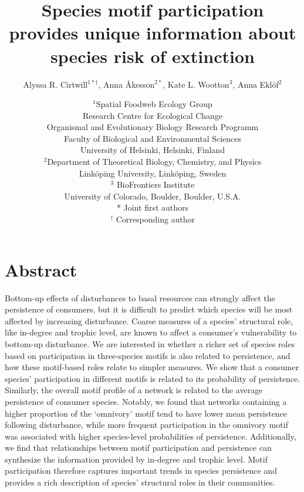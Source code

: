\documentclass[12pt]{article}
\title{Species motif participation provides unique information about species risk of extinction}
\author{Alyssa R. Cirtwill$^{1*\dagger}$, Anna \r{A}kesson$^{2*}$, Kate L. Wootton$^{3}$, Anna Ekl\"{o}f$^{2}$}
\date{
\small$^1$Spatial Foodweb Ecology Group\\
Research Centre for Ecological Change\\
Organismal and Evolutionary Biology Research Programm\\
Faculty of Biological and Environmental Sciences\\
University of Helsinki, Helsinki, Finland\\
\medskip
\small$^2$Department of Theoretical Biology, Chemistry, and Physics\\ 
Link\"{o}ping University, Link\"{o}ping, Sweden\\
\medskip
\small$^3$ BioFrontiers Institute\\
University of Colorado, Boulder, Boulder, U.S.A.\\
\medskip
* Joint first authors\\
\medskip
$^\dagger$ Corresponding author\\
}
\begin{document}
 
\maketitle 
\linenumbers
\raggedright

\setlength{\parindent}{15pt} 


\section*{Abstract}


    Bottom-up effects of disturbances to basal resources can strongly affect the persistence of consumers, but it is difficult to predict which species will be most affected by increasing disturbance.
    Coarse measures of a species' structural role, like in-degree and trophic level, are known to affect a consumer's vulnerability to bottom-up disturbance.
    We are interested in whether a richer set of species roles based on participation in three-species motifs is also related to persistence, and how these motif-based roles relate to simpler measures.
    We show that a consumer species' participation in different motifs is related to its probability of persistence. 
    Similarly, the overall motif profile of a network is related to the average persistence of consumer species.
    Notably, we found that networks containing a higher proportion of the `omnivory' motif tend to have lower mean persistence following disturbance, while more frequent participation in the omnivory motif was associated with higher species-level probabilities of persistence.
    Additionally, we find that relationships between motif participation and persistence can synthesize the information provided by in-degree and trophic level.
    Motif participation therefore captures important trends in species persistence and provides a rich description of species' structural roles in their communities.
\end{document}
